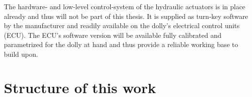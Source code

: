 \documentclass[ExampleMasters.tex]{subfiles}
\begin{document}
The hardware- and low-level control-system of the hydraulic actuators is in place already and thus will not be part of this thesis. It is supplied as turn-key software by the manufacturer and readily available on the dolly's electrical control units (ECU). The ECU's software version will be available fully calibrated and parametrized for the dolly at hand and thus provide a reliable working base to build upon. 


\section{Structure of this work}
\label{sec:structure}
\end{document}
